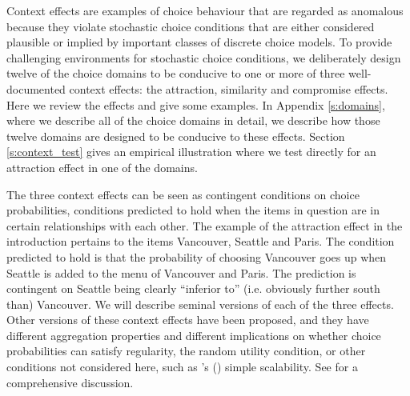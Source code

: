 \documentclass[11pt,letter]{article}
\newcommand{\menu}{menu}
\begin{document}
Context effects are examples of choice behaviour that are regarded as anomalous because they violate stochastic choice conditions that are either considered plausible or implied by important classes of discrete choice models.
To provide challenging environments for stochastic choice conditions, we deliberately design twelve of the choice domains to be conducive to one or more of three well-documented context effects: the attraction, similarity and compromise effects.
Here we review the effects and give some examples.
In Appendix \ref{s:domains}, where we describe all of the choice domains in detail, we describe how those twelve domains are designed to be conducive to these effects.
Section \ref{s:context_test} gives an empirical illustration where we test directly for an attraction effect in one of the domains.

The three context effects can be seen as contingent conditions on choice probabilities, conditions predicted to hold when the items in question are in certain relationships with each other.
The example of the attraction effect in the introduction pertains to the items Vancouver, Seattle and Paris.
The condition predicted to hold is that the probability of choosing Vancouver goes up when Seattle is added to the \menu{} of Vancouver and Paris.
The prediction is contingent on Seattle being clearly ``inferior to'' (i.e. obviously further south than) Vancouver.
We will describe seminal versions of each of the three effects.
Other versions of these context effects have been proposed, and they have different aggregation properties and different implications on whether choice probabilities can satisfy regularity, the random utility condition, or other conditions not considered here, such as \citeauthor{Kran67}'s (\citeyear{Kran67}) simple scalability.
See \citet{StobMarlMcCaTurn23} for a comprehensive discussion.
\end{document}
